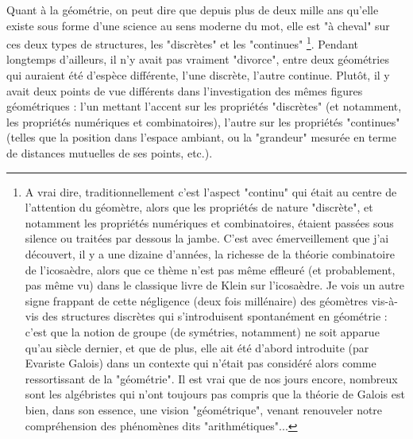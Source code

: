 Quant à la géométrie, on peut dire que depuis plus de deux mille ans qu'elle existe sous forme d'une science au sens moderne du mot, elle est "à cheval" sur ces deux types de structures, les "discrètes" et les "continues" \footnote{A vrai dire, traditionnellement c'est l'aspect "continu" qui était au centre de l'attention du géomètre, alors que les propriétés de nature "discrète", et notamment les propriétés numériques et combinatoires, étaient passées sous silence ou traitées par dessous la jambe. C'est avec émerveillement que j'ai découvert, il y a une dizaine d'années, la richesse de la théorie combinatoire de l'icosaèdre, alors que ce thème n'est pas même effleuré (et probablement, pas même vu) dans le classique livre de Klein sur l'icosaèdre. Je vois un autre signe frappant de cette négligence (deux fois millénaire) des géomètres vis-à-vis des structures discrètes qui s'introduisent spontanément en géométrie : c'est que la notion de groupe (de symétries, notamment) ne soit apparue qu'au siècle dernier, et que de plus, elle ait été d'abord introduite (par Evariste Galois) dans un contexte qui n'était pas considéré alors comme ressortissant de la "géométrie". Il est vrai que de nos jours encore, nombreux sont les algébristes qui n'ont toujours pas compris que la théorie de Galois est bien, dans son essence, une vision "géométrique", venant renouveler notre compréhension des phénomènes dits "arithmétiques"...}. Pendant longtemps d'ailleurs, il n'y avait pas vraiment "divorce", entre deux géométries qui auraient été d'espèce différente, l'une discrète, l'autre continue. Plutôt, il y avait deux points de vue différents dans l'investigation des mêmes figures géométriques : l'un mettant l'accent sur les propriétés "discrètes" (et notamment, les propriétés numériques et combinatoires), l'autre sur les propriétés "continues" (telles que la position dans l'espace ambiant, ou la "grandeur" mesurée en terme de distances mutuelles de ses points, etc.).

